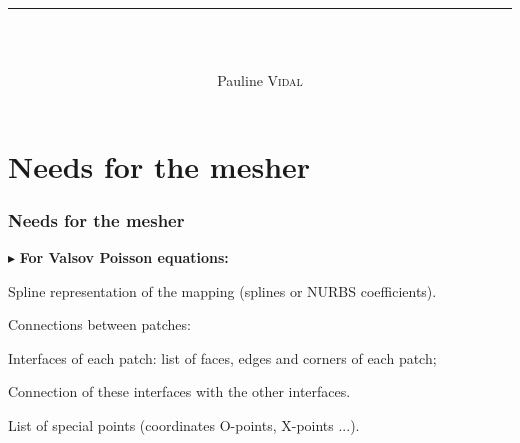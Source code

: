\documentclass[t,10pt,a3paper]{beamer} %
\title{ \textbf{\textsc{ }} \\\rule{\linewidth}{0.1mm} }
\subtitle{ \\ \quad }
\author{Pauline \textsc{Vidal}}
\date{}
\begin{document}

\fontsize{8}{8}




\section{Needs for the mesher}
\begin{frame} %
\frametitle{\color{vert}\textbf{Needs for the mesher}}
\footnotesize	

\vspace*{0.25cm}
{\color{vert}$\blacktriangleright$ }
\textbf{For Valsov Poisson equations:}

\vspace*{0.15cm}

\qquad {\color{vert}$\triangleright$} Spline representation of the mapping (splines or NURBS coefficients). \par 

\vspace*{0.15cm}
\qquad {\color{vert}$\triangleright$} Connections between patches: \par 
\qquad \qquad {\color{vert}$\bullet$} Interfaces of each patch: list of faces, edges and corners of each patch; \par
\qquad \qquad {\color{vert}$\bullet$}  Connection of these interfaces with the other interfaces. \par 

\vspace*{0.15cm}
\qquad {\color{vert}$\triangleright$} List of special points (coordinates O-points, X-points ...).


\end{frame}
\end{document}
